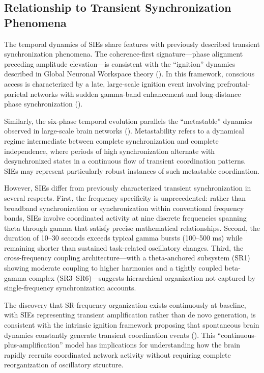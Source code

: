 \documentclass[11pt,a4paper]{article}
\begin{document}
\subsection{Relationship to Transient Synchronization Phenomena}

The temporal dynamics of SIEs share features with previously described transient synchronization phenomena. The coherence-first signature—phase alignment preceding amplitude elevation—is consistent with the ``ignition'' dynamics described in Global Neuronal Workspace theory (\cite{dehaene2011experimental, mashour2020conscious}). In this framework, conscious access is characterized by a late, large-scale ignition event involving prefrontal-parietal networks with sudden gamma-band enhancement and long-distance phase synchronization (\cite{gaillard2009converging}).

Similarly, the six-phase temporal evolution parallels the ``metastable'' dynamics observed in large-scale brain networks (\cite{tognoli2014metastable, deco2017dynamics}). Metastability refers to a dynamical regime intermediate between complete synchronization and complete independence, where periods of high synchronization alternate with desynchronized states in a continuous flow of transient coordination patterns. SIEs may represent particularly robust instances of such metastable coordination.

However, SIEs differ from previously characterized transient synchronization in several respects. First, the frequency specificity is unprecedented: rather than broadband synchronization or synchronization within conventional frequency bands, SIEs involve coordinated activity at nine discrete frequencies spanning theta through gamma that satisfy precise mathematical relationships. Second, the duration of 10–30 seconds exceeds typical gamma bursts (100–500 ms) while remaining shorter than sustained task-related oscillatory changes. Third, the cross-frequency coupling architecture—with a theta-anchored subsystem (SR1) showing moderate coupling to higher harmonics and a tightly coupled beta-gamma complex (SR3–SR6)—suggests hierarchical organization not captured by single-frequency synchronization accounts.

The discovery that SR-frequency organization exists continuously at baseline, with SIEs representing transient amplification rather than de novo generation, is consistent with the intrinsic ignition framework proposing that spontaneous brain dynamics constantly generate transient coordination events (\cite{deco2017dynamics}). This ``continuous-plus-amplification'' model has implications for understanding how the brain rapidly recruits coordinated network activity without requiring complete reorganization of oscillatory structure.
\end{document}
